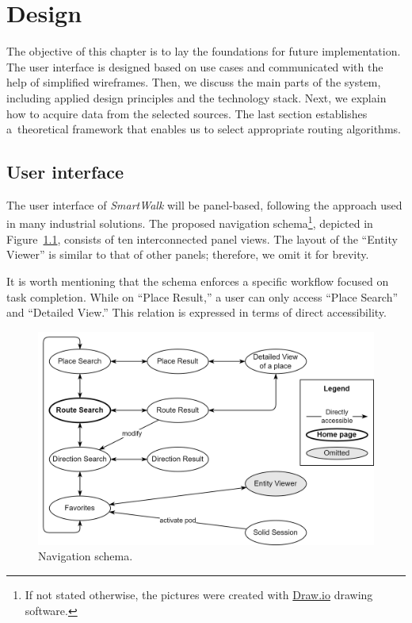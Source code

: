 \chapter{Design}\label{chap:design}

The objective of this chapter is to lay the foundations for future implementation. The user interface is designed based on use cases and communicated with the help of simplified wireframes. Then, we discuss the main parts of the system, including applied design principles and the technology stack. Next, we explain how to acquire data from the selected sources. The last section establishes a~the\-o\-ret\-i\-cal framework that enables us to select appropriate routing algorithms.

\section{User interface}\label{sec:user-interface}

The user interface of \emph{SmartWalk} will be panel-based, following the approach used in many industrial solutions. The proposed navigation schema\footnote{If not stated otherwise, the pictures were created with \href{https://draw.io/}{Draw.io} drawing software.}, depicted in Figure~\ref{fig:ui-navigation-schema}, consists of ten interconnected panel views. The layout of the ``Entity Viewer'' is similar to that of other panels; therefore, we omit it for brevity.

It is worth mentioning that the schema enforces a specific workflow focused on task completion. While on ``Place Result,'' a user can only access ``Place Search'' and ``Detailed View.'' This relation is expressed in terms of direct accessibility.

\begin{figure}[!h]
\centering
\includegraphics[width=0.9\linewidth]{img/design/ui-navigation-schema.png}
\caption{Navigation schema.}
\label{fig:ui-navigation-schema}
\end{figure}

